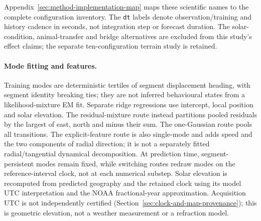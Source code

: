 \noindent Appendix~\ref{sec:method-implementation-map} maps these scientific
names to the complete configuration inventory. The \texttt{dt} labels denote
observation/training and history cadence in seconds, not integration step
or forecast duration. The solar-condition, animal-transfer and bridge
alternatives are excluded from this study's effect claims; the separate
ten-configuration terrain study is retained.

\paragraph{Mode fitting and features.}
Training modes are deterministic tertiles of segment displacement heading,
with segment identity breaking ties; they are not inferred behavioural states
from a likelihood-mixture EM fit. Separate ridge regressions use intercept,
local position and solar elevation. The residual-mixture route instead
partitions pooled residuals by the largest of east, north and minus their sum.
The one-Gaussian route pools all transitions. The explicit-feature route is
also single-mode and adds speed and the two components of radial direction;
it is not a separately fitted radial/tangential dynamical decomposition.
At prediction time, segment-persistent modes remain fixed, while switching
routes redraw modes on the reference-interval clock, not at each numerical
substep. Solar elevation is recomputed from predicted geography and the
retained clock using its model UTC interpretation and the NOAA fractional-year
approximation\cite{noaa}. Acquisition UTC is not independently certified
(Section~\ref{sec:clock-and-map-provenance}); this is geometric elevation,
not a weather measurement or a refraction model.


